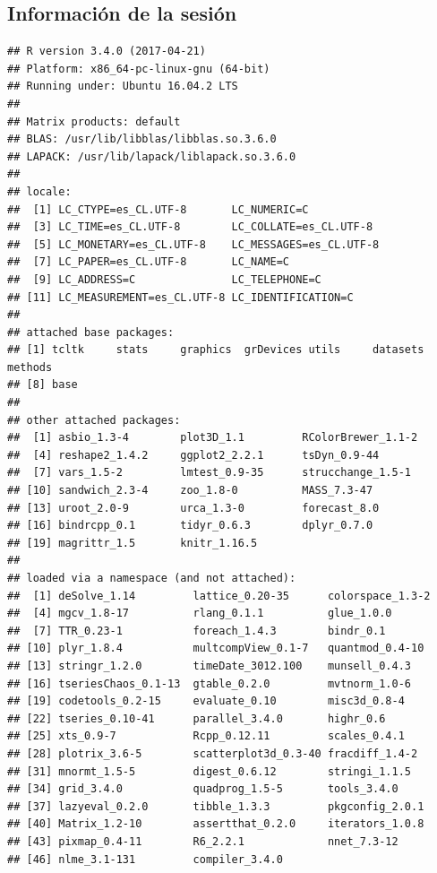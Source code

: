 \documentclass[12pt, twoside]{book}\usepackage[]{graphicx}\usepackage[]{color}
\makeatletter
\newenvironment{kframe}{%
 \def\at@end@of@kframe{}%
 \ifinner\ifhmode%
  \def\at@end@of@kframe{\end{minipage}}%
  \begin{minipage}{\columnwidth}%
 \fi\fi%
 \def\FrameCommand##1{\hskip\@totalleftmargin \hskip-\fboxsep
 \colorbox{shadecolor}{##1}\hskip-\fboxsep
     \hskip-\linewidth \hskip-\@totalleftmargin \hskip\columnwidth}%
 \MakeFramed {\advance\hsize-\width
   \@totalleftmargin\z@ \linewidth\hsize
   \@setminipage}}%
 {\par\unskip\endMakeFramed%
 \at@end@of@kframe}
\newenvironment{knitrout}{}{} %
\numberwithin{equation}{section}
\numberwithin{theorem}{section}
\numberwithin{teorema}{section}
\numberwithin{defi}{section}
\numberwithin{prop}{section}
\numberwithin{defi}{section}
\theoremstyle{plain}
\makeatother
\begin{document}
\subsection{Información de la sesión}
\begin{knitrout}\scriptsize
{}\color{fgcolor}\begin{kframe}
\begin{verbatim}
## R version 3.4.0 (2017-04-21)
## Platform: x86_64-pc-linux-gnu (64-bit)
## Running under: Ubuntu 16.04.2 LTS
## 
## Matrix products: default
## BLAS: /usr/lib/libblas/libblas.so.3.6.0
## LAPACK: /usr/lib/lapack/liblapack.so.3.6.0
## 
## locale:
##  [1] LC_CTYPE=es_CL.UTF-8       LC_NUMERIC=C              
##  [3] LC_TIME=es_CL.UTF-8        LC_COLLATE=es_CL.UTF-8    
##  [5] LC_MONETARY=es_CL.UTF-8    LC_MESSAGES=es_CL.UTF-8   
##  [7] LC_PAPER=es_CL.UTF-8       LC_NAME=C                 
##  [9] LC_ADDRESS=C               LC_TELEPHONE=C            
## [11] LC_MEASUREMENT=es_CL.UTF-8 LC_IDENTIFICATION=C       
## 
## attached base packages:
## [1] tcltk     stats     graphics  grDevices utils     datasets  methods  
## [8] base     
## 
## other attached packages:
##  [1] asbio_1.3-4        plot3D_1.1         RColorBrewer_1.1-2
##  [4] reshape2_1.4.2     ggplot2_2.2.1      tsDyn_0.9-44      
##  [7] vars_1.5-2         lmtest_0.9-35      strucchange_1.5-1 
## [10] sandwich_2.3-4     zoo_1.8-0          MASS_7.3-47       
## [13] uroot_2.0-9        urca_1.3-0         forecast_8.0      
## [16] bindrcpp_0.1       tidyr_0.6.3        dplyr_0.7.0       
## [19] magrittr_1.5       knitr_1.16.5      
## 
## loaded via a namespace (and not attached):
##  [1] deSolve_1.14         lattice_0.20-35      colorspace_1.3-2    
##  [4] mgcv_1.8-17          rlang_0.1.1          glue_1.0.0          
##  [7] TTR_0.23-1           foreach_1.4.3        bindr_0.1           
## [10] plyr_1.8.4           multcompView_0.1-7   quantmod_0.4-10     
## [13] stringr_1.2.0        timeDate_3012.100    munsell_0.4.3       
## [16] tseriesChaos_0.1-13  gtable_0.2.0         mvtnorm_1.0-6       
## [19] codetools_0.2-15     evaluate_0.10        misc3d_0.8-4        
## [22] tseries_0.10-41      parallel_3.4.0       highr_0.6           
## [25] xts_0.9-7            Rcpp_0.12.11         scales_0.4.1        
## [28] plotrix_3.6-5        scatterplot3d_0.3-40 fracdiff_1.4-2      
## [31] mnormt_1.5-5         digest_0.6.12        stringi_1.1.5       
## [34] grid_3.4.0           quadprog_1.5-5       tools_3.4.0         
## [37] lazyeval_0.2.0       tibble_1.3.3         pkgconfig_2.0.1     
## [40] Matrix_1.2-10        assertthat_0.2.0     iterators_1.0.8     
## [43] pixmap_0.4-11        R6_2.2.1             nnet_7.3-12         
## [46] nlme_3.1-131         compiler_3.4.0
\end{verbatim}
\end{kframe}
\end{knitrout}
\end{document}
